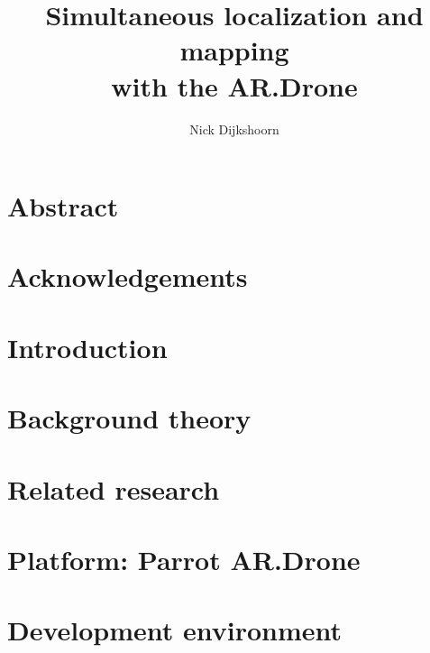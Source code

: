 \documentclass[twoside]{uva-bachelor-thesis}
\title{Simultaneous localization and mapping \\ \vspace{0.5cm} with the AR.Drone}
\author{Nick Dijkshoorn}
\begin{document}
\maketitle





\chapter*{Abstract}




\chapter*{Acknowledgements}




\tableofcontents
{}



\chapter{Introduction}




\chapter{Background theory}



\chapter{Related research}




\chapter{Platform: Parrot AR.Drone}




\chapter{Development environment}

\end{document}
